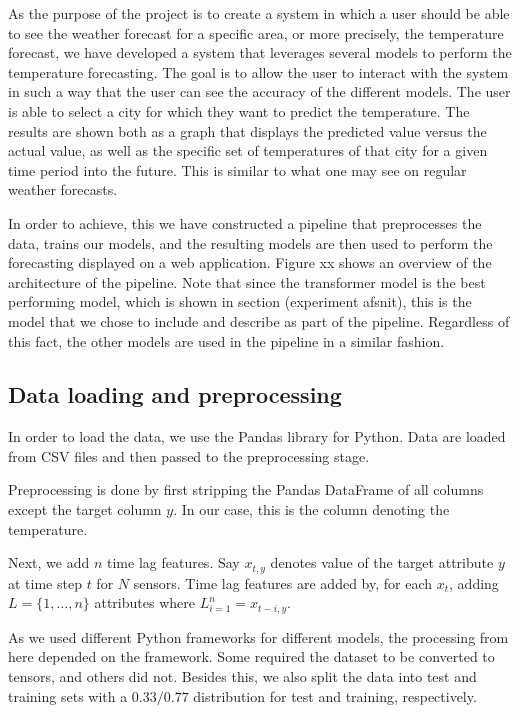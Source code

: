 As the purpose of the project is to create a system in which a user should be able to see the weather forecast for a specific area, or more precisely, the temperature forecast, we have developed a system that leverages several models to perform the temperature forecasting. 
The goal is to allow the user to interact with the system in such a way that the user can see the accuracy of the different models. 
The user is able to select a city for which they want to predict the temperature. The results are shown both as a graph that displays the predicted value versus the actual value, as well as the specific set of temperatures of that city for a given time period into the future. This is similar to what one may see on regular weather forecasts.

In order to achieve, this we have constructed a pipeline that preprocesses the data, trains our models, and the resulting models are then used to perform the forecasting displayed on a web application. 
Figure xx shows an overview of the architecture of the pipeline.
Note that since the transformer model is the best performing model, which is shown in section (experiment afsnit), this is the model that we chose to include and describe as part of the pipeline. Regardless of this fact, the other models are used in the pipeline in a similar fashion.

\subsection{Data loading and preprocessing}
In order to load the data, we use the Pandas library for Python.
Data are loaded from CSV files and then passed to the preprocessing stage.

Preprocessing is done by first stripping the Pandas DataFrame of all columns except the target column $y$. In our case, this is the column denoting the temperature.

Next, we add $n$ time lag features. Say $x_{t,y}$ denotes value of the target attribute $y$ at time step $t$ for $N$ sensors. Time lag features are added by, for each $x_{t}$, adding $L=\{1,\dots, n\}$ attributes where $L_{i=1}^n=x_{t-i, y}$.

As we used different Python frameworks for different models, the processing from here depended on the framework. Some required the dataset to be converted to tensors, and others did not.
Besides this, we also split the data into test and training sets with a $0.33/0.77$ distribution for test and training, respectively.

